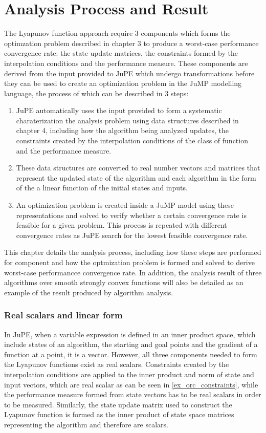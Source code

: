 \chapter{Analysis Process and Result}

The Lyapunov function approach require 3 components which forms the optimzation problem described in chapter 3 to produce a worst-case performance convergence rate: the state update matrices, the constraints formed by the interpolation conditions and the performance measure. These components are derived from the input provided to JuPE which undergo transformations before they can be used to create an optimization problem in the JuMP modelling language, the process of which can be described in 3 steps:
\begin{enumerate}
    \item JuPE automatically uses the input provided to form a systematic charaterization the analysis problem using data structures described in chapter 4, including how the algorithm being analyzed updates, the constraints created by the interpolation conditions of the class of function and the performance measure.
    \item These data structures are converted to real number vectors and matrices that represent the updated state of the algorithm and each algorithm in the form of the a linear function of the initial states and inputs.
    \item An optimization problem is created inside a JuMP model using these representations and solved to verify whether a certain convergence rate is feasible for a given problem. This process is repeated with different convergence rates as JuPE search for the lowest feasible convergence rate.
\end{enumerate}

This chapter details the analysis process, including how these steps are performed for component and how the optmization problem is formed and solved to derive worst-case performancce convergence rate. In addition, the analysis result of three algorithms over smooth strongly convex functions will also be detailed as an example of the result produced by algorithm analysis.

\subsection*{Real scalars and linear form}

In JuPE, when a variable expression is defined in an inner product space, which include states of an algorithm, the starting and goal points and the gradient of a function at a point, it is a vector. However, all three components needed to form the Lyapunov functions exist as real scalars. Constraints created by the interpolation conditions are applied to the inner product and norm of state and input vectors, which are real scalar as can be seen in \ref{ex_orc_constraints}, while the performance measure formed from state vectors has to be real scalars in order to be measured. Similarly, the state update matrix used to construct the Lyapunov function is formed as the inner product of state space matrices representing the algorithm and therefore are scalars.

